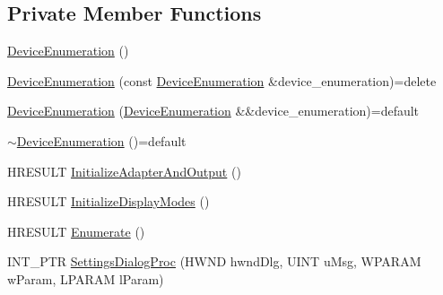 \subsection*{Private Member Functions}
\begin{DoxyCompactItemize}
\item 
\hyperlink{classmage_1_1_device_enumeration_aa000048648beb6c2aca70e5ef04e0da2}{Device\+Enumeration} ()
\item 
\hyperlink{classmage_1_1_device_enumeration_a90f3dc13cfb413aa8a2a49a31bcb6ae3}{Device\+Enumeration} (const \hyperlink{classmage_1_1_device_enumeration}{Device\+Enumeration} \&device\+\_\+enumeration)=delete
\item 
\hyperlink{classmage_1_1_device_enumeration_a392d44d5caa552437a279538083c6d2e}{Device\+Enumeration} (\hyperlink{classmage_1_1_device_enumeration}{Device\+Enumeration} \&\&device\+\_\+enumeration)=default
\item 
\hyperlink{classmage_1_1_device_enumeration_ae32bc5dacf47b7deca4729d8b3cb66dc}{$\sim$\+Device\+Enumeration} ()=default
\item 
H\+R\+E\+S\+U\+LT \hyperlink{classmage_1_1_device_enumeration_a56806d9667b446bf14236b1f42aefb28}{Initialize\+Adapter\+And\+Output} ()
\item 
H\+R\+E\+S\+U\+LT \hyperlink{classmage_1_1_device_enumeration_ac4644c68492b919362e21f2e47fbad93}{Initialize\+Display\+Modes} ()
\item 
H\+R\+E\+S\+U\+LT \hyperlink{classmage_1_1_device_enumeration_a4fea0ffef733632456b281f74608a239}{Enumerate} ()
\item 
I\+N\+T\+\_\+\+P\+TR \hyperlink{classmage_1_1_device_enumeration_a5950a6575d9073d6d23b228779f5ace1}{Settings\+Dialog\+Proc} (H\+W\+ND hwnd\+Dlg, U\+I\+NT u\+Msg, W\+P\+A\+R\+AM w\+Param, L\+P\+A\+R\+AM l\+Param)
\end{DoxyCompactItemize}
